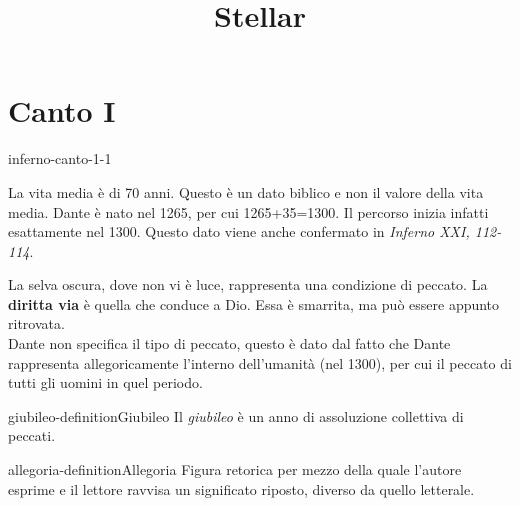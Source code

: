 \documentclass[preview]{standalone}
\begin{document}
\title{Stellar}
\genpage

\section{Canto I}


\begin{snippet}{inferno-canto-1-1}

    La vita media è di 70 anni. Questo è un dato biblico e non il valore della vita media.
    Dante è nato nel 1265, per cui 1265+35=1300. Il percorso inizia infatti esattamente nel 1300.
    Questo dato viene anche confermato in \textit{Inferno XXI, 112-114}.

    La selva oscura, dove non vi è luce, rappresenta una condizione di peccato.
    La \textbf{diritta via} è quella che conduce a Dio.
    Essa è smarrita, ma può essere appunto ritrovata.
    \\
    Dante non specifica il tipo di peccato, questo è dato dal fatto che Dante rappresenta allegoricamente
    l'interno dell'umanità (nel 1300), per cui il peccato di tutti gli uomini in quel periodo.
\end{snippet}

\begin{snippetdefinition}{giubileo-definition}{Giubileo}
    Il \textit{giubileo} è un anno di assoluzione collettiva di peccati.
\end{snippetdefinition}


\begin{snippetdefinition}{allegoria-definition}{Allegoria}
    Figura retorica per mezzo della quale l'autore esprime e il lettore ravvisa un significato riposto,
    diverso da quello letterale.
\end{snippetdefinition}
\end{document}
